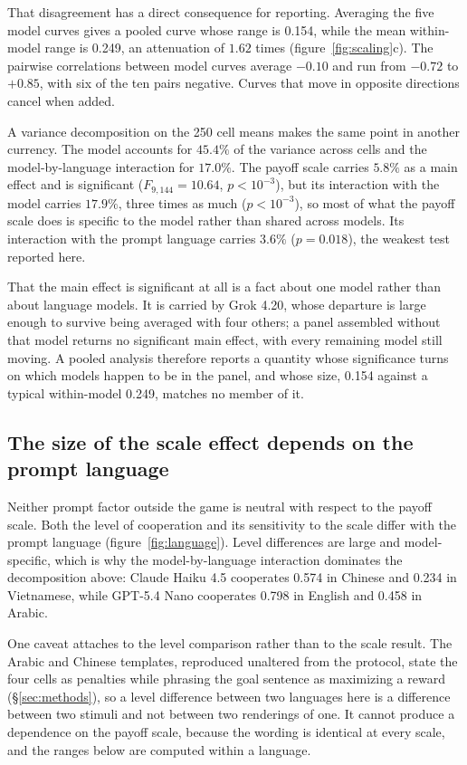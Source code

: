 \documentclass[11pt,a4paper]{article}
\begin{document}


That disagreement has a direct consequence for reporting. Averaging the five
model curves gives a pooled curve whose range is
0.154, while the mean within-model range is 0.249, an attenuation of $1.62$
times (figure~\ref{fig:scaling}c). The pairwise correlations between model curves
average $-0.10$ and run from $-0.72$ to $+0.85$, with six of the ten pairs
negative. Curves that move in opposite directions cancel when added.

A variance decomposition on the 250 cell means makes the same point in another
currency. The model
accounts for $45.4\%$ of the
variance across cells and the model-by-language interaction for $17.0\%$. The
payoff scale carries $5.8\%$ as a main effect and is significant
($F_{9,144} = 10.64$, $p < 10^{-3}$), but its interaction with the model
carries $17.9\%$, three times as much ($p < 10^{-3}$), so most of what the
payoff scale does is specific to the model rather than shared across models.
Its interaction with the prompt language carries $3.6\%$ ($p = 0.018$), the
weakest test reported here.

That the main effect is significant at all is a fact about one model rather than
about language models. It is carried by Grok 4.20, whose departure is large
enough to survive being averaged with four others; a panel assembled without
that model returns no significant main effect, with every remaining model still
moving. A pooled analysis therefore reports a quantity whose significance turns
on which models happen to be in the panel, and whose size, 0.154 against a
typical within-model 0.249, matches no member of it.

\subsection{The size of the scale effect depends on the prompt language}

Neither prompt factor outside the game is neutral with respect to the payoff
scale. Both the level of cooperation and its sensitivity to the scale differ
with the prompt language (figure~\ref{fig:language}). Level differences are
large and model-specific, which is why the model-by-language interaction
dominates the decomposition above: Claude Haiku 4.5 cooperates 0.574 in Chinese
and 0.234 in Vietnamese, while GPT-5.4 Nano cooperates 0.798 in English and
0.458 in Arabic.

One caveat attaches to the level comparison rather than to the scale result.
The Arabic and Chinese templates, reproduced unaltered from the protocol, state
the four cells as penalties while phrasing the goal sentence as maximizing a
reward (\S\ref{sec:methods}), so a level difference between two languages here
is a difference between two stimuli and not between two renderings of one. It
cannot produce a dependence on the payoff scale, because the wording is
identical at every scale, and the ranges below are computed within a language.
\end{document}
